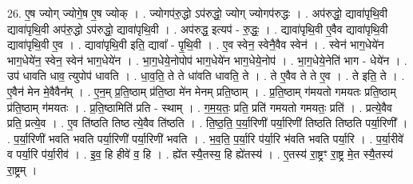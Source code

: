 \documentclass[17pt]{extarticle}
\begin{document}
26. ए॒ष ज्योग् ज्योगे॒ष ए॒ष ज्योक् । . ज्योगप॑रु॒द्धो ऽप॑रुद्धो॒ ज्योग् ज्योगप॑रुद्धः । . अप॑रुद्धो॒ द्यावा॑पृथि॒वी द्यावा॑पृथि॒वी अप॑रु॒द्धो ऽप॑रुद्धो॒ द्यावा॑पृथि॒वी । . अप॑रुद्ध॒ इत्यप॑ - रु॒द्धः॒ । . द्यावा॑पृथि॒वी ए॒वैव द्यावा॑पृथि॒वी द्यावा॑पृथि॒वी ए॒व । . द्यावा॑पृथि॒वी इति॒ द्यावा᳚ - पृ॒थि॒वी । . ए॒व स्वेन॒ स्वेनै॒वैव स्वेन॑ । . स्वेन॑ भाग॒धेये॑न भाग॒धेये॑न॒ स्वेन॒ स्वेन॑ भाग॒धेये॑न । . भा॒ग॒धेये॒नोपोप॑ भाग॒धेये॑न भाग॒धेये॒नोप॑ । . भा॒ग॒धेये॒नेति॑ भाग - धेये॑न । . उप॑ धावति धाव॒ त्युपोप॑ धावति । . धा॒व॒ति॒ ते ते धा॑वति धावति॒ ते । . ते ए॒वैव ते ते ए॒व । . ते इति॒ ते । . ए॒वैन॑ मेन मे॒वैवैन᳚म् । . ए॒न॒म् प्र॒ति॒ष्ठाम् प्र॑ति॒ष्ठा मे॑न मेनम् प्रति॒ष्ठाम् । . प्र॒ति॒ष्ठाम् ग॑मयतो गमयतः प्रति॒ष्ठाम् प्र॑ति॒ष्ठाम् ग॑मयतः । . प्र॒ति॒ष्ठामिति॑ प्रति - स्थाम् । . ग॒म॒य॒तः॒ प्रति॒ प्रति॑ गमयतो गमयतः॒ प्रति॑ । . प्रत्ये॒वैव प्रति॒ प्रत्ये॒व । . ए॒व ति॑ष्ठति तिष्ठ त्ये॒वैव ति॑ष्ठति । . ति॒ष्ठ॒ति॒ प॒र्या॒रिणी॑ पर्या॒रिणी॑ तिष्ठति तिष्ठति पर्या॒रिणी᳚ । . प॒र्या॒रिणी॑ भवति भवति पर्या॒रिणी॑ पर्या॒रिणी॑ भवति । . भ॒व॒ति॒ प॒र्या॒रि प॑र्या॒रि भ॑वति भवति पर्या॒रि । . प॒र्या॒रीवे॑ व पर्या॒रि प॑र्या॒रीव॑ । . इ॒व॒ हि हीवे॑ व॒ हि । . ह्ये॑त स्यै॒तस्य॒ हि ह्ये॑तस्य॑ । . ए॒तस्य॑ रा॒ष्ट्रꣳ रा॒ष्ट्र मे॒त स्यै॒तस्य॑ रा॒ष्ट्रम् । \newline
\end{document}

